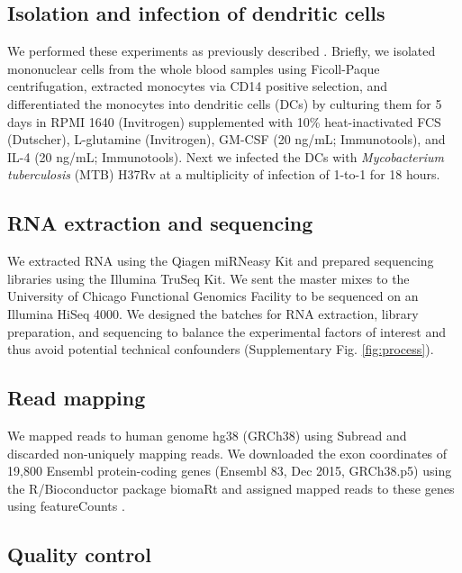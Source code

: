 \documentclass[fleqn,10pt]{wlscirep}
\begin{document}
\subsection*{Isolation and infection of dendritic cells}

We performed these experiments as previously described
\cite{Barreiro2012}. Briefly, we isolated mononuclear cells from the
whole blood samples using Ficoll-Paque centrifugation, extracted
monocytes via CD14 positive selection, and differentiated the
monocytes into dendritic cells (DCs) by culturing them for 5 days in
RPMI 1640 (Invitrogen) supplemented with 10\% heat-inactivated FCS
(Dutscher), L-glutamine (Invitrogen), GM-CSF (20 ng/mL; Immunotools),
and IL-4 (20 ng/mL; Immunotools). Next we infected the DCs with
\emph{Mycobacterium tuberculosis} (MTB) H37Rv at a multiplicity of
infection of 1-to-1 for 18 hours.
\subsection*{RNA extraction and sequencing}

We extracted RNA using the Qiagen miRNeasy Kit and prepared sequencing
libraries using the Illumina TruSeq Kit. We sent the master mixes to
the University of Chicago Functional Genomics Facility to be sequenced
on an Illumina HiSeq 4000. We designed the batches for RNA extraction,
library preparation, and sequencing to balance the experimental
factors of interest and thus avoid potential technical confounders
(Supplementary Fig. \ref{fig:process}).
\subsection*{Read mapping}

We mapped reads to human genome hg38 (GRCh38) using Subread
\cite{Liao2013} and discarded non-uniquely mapping reads. We
downloaded the exon coordinates of 19,800 Ensembl \cite{Yates2016}
protein-coding genes (Ensembl 83, Dec 2015, GRCh38.p5) using the
R/Bioconductor \cite{Huber2015} package biomaRt \cite{Durinck2005,
Durinck2009} and assigned mapped reads to these genes using
featureCounts \cite{Liao2014}.
\subsection*{Quality control}
\end{document}
